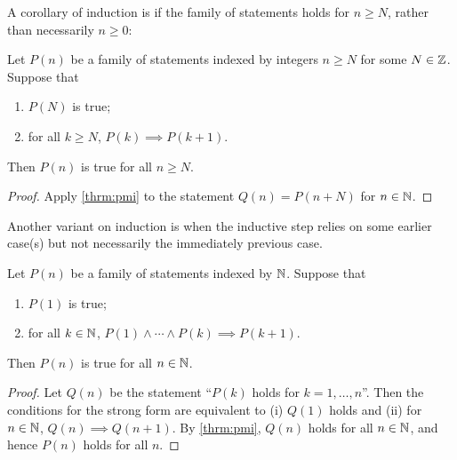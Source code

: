 A corollary of induction is if the family of statements holds for $n\ge N$, rather than necessarily $n\ge0$:

\begin{corollary}
Let $P(n)$ be a family of statements indexed by integers $n\ge N$ for some $N\in\mathbb Z$. Suppose that 
\begin{enumerate}[label=(\roman*)]
\item $P(N)$ is true;
\item for all $k \ge N$, $P(k) \implies P(k+1)$. 
\end{enumerate}
Then $P(n)$ is true for all $n \ge N$.
\end{corollary}

\begin{proof}
Apply \ref{thrm:pmi} to the statement $Q(n)=P(n+N)$ for $n\in\mathbb N$.
\end{proof}

Another variant on induction is when the inductive step relies on some earlier case(s) but not necessarily the immediately previous case.

\begin{theorem}\label{thrm:strong-induction}
Let $P(n)$ be a family of statements indexed by $\mathbb N$. Suppose that
\begin{enumerate}[label=(\roman*)]
\item $P(1)$ is true;
\item for all $k\in\mathbb N$, $P(1)\land\cdots\land P(k)\implies P(k+1)$.
\end{enumerate}
Then $P(n)$ is true for all $n\in\mathbb N$.
\end{theorem}

\begin{proof}
Let $Q(n)$ be the statement ``$P(k)$ holds for $k=1,\dots,n$''. Then the conditions for the strong form are equivalent to (i) $Q(1)$ holds and (ii) for $n\in\mathbb N$, $Q(n)\implies Q(n+1)$. By \ref{thrm:pmi}, $Q(n)$ holds for all $n\in\mathbb N$, and hence $P(n)$ holds for all $n$.
\end{proof}

